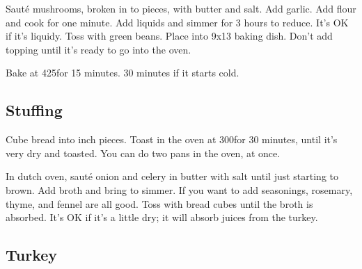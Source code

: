 \begin{recipe}
Sauté mushrooms, broken in to pieces, with butter and salt. Add garlic. Add flour and cook for one minute. Add liquids and simmer for 3 hours to reduce. It's OK if it's liquidy. Toss with green beans. Place into 9x13 baking dish. Don't add topping until it's ready to go into the oven.

Bake at 425\degree for 15 minutes. 30 minutes if it starts cold. 

\subsection{Stuffing}



Cube bread into  inch pieces. Toast in the oven at 300\degree for 30 minutes, until it's very dry and toasted. You can do two pans in the oven, at once. 



In dutch oven, sauté onion and celery in butter with salt until just starting to brown. Add broth and bring to simmer. If you want to add seasonings, rosemary, thyme, and fennel are all good. Toss with bread cubes until the broth is absorbed. It's OK if it's a little dry; it will absorb juices from the turkey. 

\subsection{Turkey}




\end{recipe}
